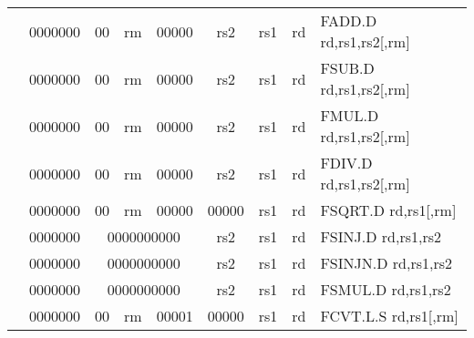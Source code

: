 \begin{table}[p]
\begin{small}
\begin{center}
\begin{tabular}{rcccccccccl}
&
\multicolumn{1}{|c|}{0000000} &
\multicolumn{1}{c|}{00} &
\multicolumn{2}{c|}{rm} &
\multicolumn{2}{c|}{00000} &
\multicolumn{1}{c|}{rs2} &
\multicolumn{1}{c|}{rs1} &
\multicolumn{1}{c|}{rd} & FADD.D rd,rs1,rs2[,rm] \\
\cline{2-10}
  

&
\multicolumn{1}{|c|}{0000000} &
\multicolumn{1}{c|}{00} &
\multicolumn{2}{c|}{rm} &
\multicolumn{2}{c|}{00000} &
\multicolumn{1}{c|}{rs2} &
\multicolumn{1}{c|}{rs1} &
\multicolumn{1}{c|}{rd} & FSUB.D rd,rs1,rs2[,rm] \\
\cline{2-10}
  

&
\multicolumn{1}{|c|}{0000000} &
\multicolumn{1}{c|}{00} &
\multicolumn{2}{c|}{rm} &
\multicolumn{2}{c|}{00000} &
\multicolumn{1}{c|}{rs2} &
\multicolumn{1}{c|}{rs1} &
\multicolumn{1}{c|}{rd} & FMUL.D rd,rs1,rs2[,rm] \\
\cline{2-10}
  

&
\multicolumn{1}{|c|}{0000000} &
\multicolumn{1}{c|}{00} &
\multicolumn{2}{c|}{rm} &
\multicolumn{2}{c|}{00000} &
\multicolumn{1}{c|}{rs2} &
\multicolumn{1}{c|}{rs1} &
\multicolumn{1}{c|}{rd} & FDIV.D rd,rs1,rs2[,rm] \\
\cline{2-10}
  

&
\multicolumn{1}{|c|}{0000000} &
\multicolumn{1}{c|}{00} &
\multicolumn{2}{c|}{rm} &
\multicolumn{2}{c|}{00000} &
\multicolumn{1}{c|}{00000} &
\multicolumn{1}{c|}{rs1} &
\multicolumn{1}{c|}{rd} & FSQRT.D rd,rs1[,rm] \\
\cline{2-10}
  

&
\multicolumn{1}{|c|}{0000000} &
\multicolumn{5}{c|}{0000000000} &
\multicolumn{1}{c|}{rs2} &
\multicolumn{1}{c|}{rs1} &
\multicolumn{1}{c|}{rd} & FSINJ.D rd,rs1,rs2 \\
\cline{2-10}
  

&
\multicolumn{1}{|c|}{0000000} &
\multicolumn{5}{c|}{0000000000} &
\multicolumn{1}{c|}{rs2} &
\multicolumn{1}{c|}{rs1} &
\multicolumn{1}{c|}{rd} & FSINJN.D rd,rs1,rs2 \\
\cline{2-10}
  

&
\multicolumn{1}{|c|}{0000000} &
\multicolumn{5}{c|}{0000000000} &
\multicolumn{1}{c|}{rs2} &
\multicolumn{1}{c|}{rs1} &
\multicolumn{1}{c|}{rd} & FSMUL.D rd,rs1,rs2 \\
\cline{2-10}
  

&
\multicolumn{1}{|c|}{0000000} &
\multicolumn{1}{c|}{00} &
\multicolumn{2}{c|}{rm} &
\multicolumn{2}{c|}{00001} &
\multicolumn{1}{c|}{00000} &
\multicolumn{1}{c|}{rs1} &
\multicolumn{1}{c|}{rd} & FCVT.L.S rd,rs1[,rm] \\
\cline{2-10}
  


\end{tabular}
\end{center}
\end{small}
\end{table}
